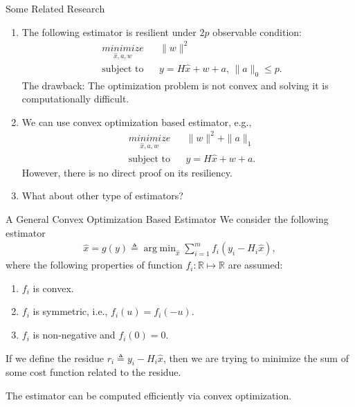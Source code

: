 \documentclass[10pt]{beamer}
\DeclareMathOperator{\argmin}{arg\;min}
\begin{document}
\begin{frame}{Some Related Research}
  \begin{enumerate}
  \item The following estimator is resilient under $2p$ observable condition:
    \begin{align*}
      & \mathop{\textit{minimize}}\limits_{\hat x,a,w}&
      & \|w\|^2 \\
      &\text{subject to}&
      &y = H \hat x + w + a,\,\|a\|_0\leq p.
    \end{align*}
    The drawback: The optimization problem is not convex and solving it is computationally difficult.
  \item We can use convex optimization based estimator, e.g., 
    \begin{align*}
      & \mathop{\textit{minimize}}\limits_{\hat x,a,w}&
      & \|w\|^2 + \|a\|_1 \\
      &\text{subject to}&
      &y = H \hat x + w + a.
    \end{align*}
    However, there is no direct proof on its resiliency.
  \item What about other type of estimators?
  \end{enumerate}
\end{frame}

\begin{frame}{A General Convex Optimization Based Estimator}
  We consider the following estimator
  \begin{align*}
    \hat x = g(y) \triangleq \argmin_{\hat x} \sum_{i=1}^m f_i(y_i-H_i \hat x),
  \end{align*}
  where the following properties of function $f_i:\mathbb R\mapsto \mathbb R$ are assumed:
  \begin{enumerate}
  \item $f_i$ is convex.
  \item $f_i$ is symmetric, i.e., $f_i(u) = f_i(-u)$.
  \item $f_i$ is non-negative and $f_i(0) = 0$.
  \end{enumerate} 

  If we define the residue $r_i\triangleq y_i - H_i\hat x$, then we are trying to minimize the sum of some cost function related to the residue.

  The estimator can be computed efficiently via convex optimization. 
\end{frame}
\end{document}
